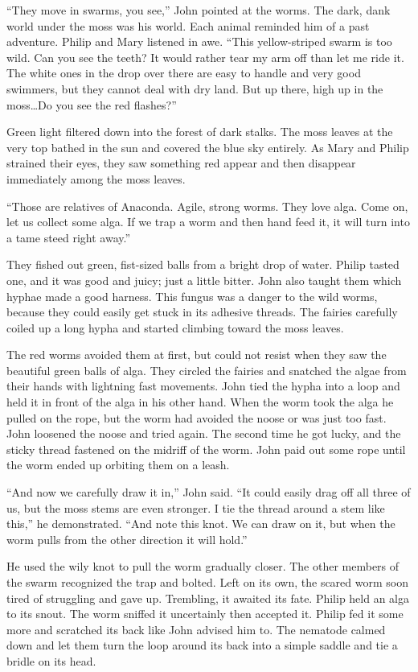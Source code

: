 \documentclass[10pt]{memoir}
\begin{document}
``They move in swarms, you see,'' John pointed at the worms. The dark, dank
world under the moss was his world. Each animal reminded him of a past
adventure. Philip and Mary listened in awe. ``This yellow-striped swarm is too
wild. Can you see the teeth? It would rather tear my arm off than let me ride
it. The white ones in the drop over there are easy to handle and very good
swimmers, but they cannot deal with dry land. But up there, high up in the
moss\dots Do you see the red flashes?''

Green light filtered down into the forest of dark stalks. The moss leaves at
the very top bathed in the sun and covered the blue sky entirely. As Mary and
Philip strained their eyes, they saw something red appear and then disappear
immediately among the moss leaves.

``Those are relatives of Anaconda. Agile, strong worms. They love alga. Come
on, let us collect some alga. If we trap a worm and then hand feed it, it will
turn into a tame steed right away.''

They fished out green, fist-sized balls from a bright drop of water. Philip
tasted one, and it was good and juicy; just a little bitter. John also taught
them which hyphae made a good harness. This fungus was a danger to the wild
worms, because they could easily get stuck in its adhesive threads. The fairies
carefully coiled up a long hypha and started climbing toward the moss leaves.

The red worms avoided them at first, but could not resist when they saw the
beautiful green balls of alga. They circled the fairies and snatched the algae
from their hands with lightning fast movements. John tied the hypha into a loop
and held it in front of the alga in his other hand. When the worm took the
alga he pulled on the rope, but the worm had avoided the noose or was just too
fast. John loosened the noose and tried again. The second time he got lucky,
and the sticky thread fastened on the midriff of the worm. John paid out some
rope until the worm ended up orbiting them on a leash.

``And now we carefully draw it in,'' John said. ``It could easily drag off all
three of us, but the moss stems are even stronger. I tie the thread around a
stem like this,'' he demonstrated. ``And note this knot. We can draw on it, but
when the worm pulls from the other direction it will hold.''

He used the wily knot to pull the worm gradually closer. The other members of
the swarm recognized the trap and bolted. Left on its own, the scared worm
soon tired of struggling and gave up. Trembling, it awaited its fate. Philip
held an alga to its snout. The worm sniffed it uncertainly then accepted it.
Philip fed it some more and scratched its back like John advised him to. The
nematode calmed down and let them turn the loop around its back into a simple
saddle and tie a bridle on its head.
\end{document}
